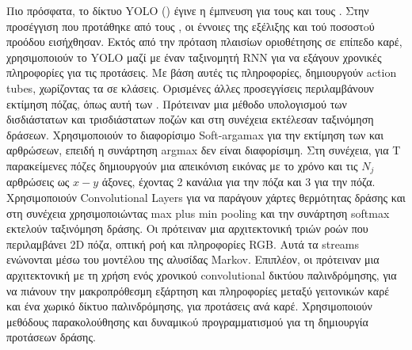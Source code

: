 Πιο πρόσφατα, το δίκτυο \en YOLO (\cite{DBLP:journals/corr/RedmonDGF15}) \gr έγινε η έμπνευση
για  τους \en \cite{DBLP:journals/corr/abs-1903-00304} \gr και τους \en \cite{DBLP:journals/corr/abs-1802-08362}\gr. Στην προσέγγιση που προτάθηκε από τους
\en  \cite{DBLP:journals/corr/abs-1903-00304}\gr, οι έννοιες της
εξέλιξης και τού ποσοστoύ προόδου εισήχθησαν. Εκτός από την πρόταση πλαισίων οριοθέτησης σε επίπεδο καρέ, χρησιμοποιούν το \en YOLO \gr μαζί με έναν ταξινομητή \en RNN \gr για
να εξάγουν χρονικές πληροφορίες για τις προτάσεις. Με βάση αυτές τις πληροφορίες, δημιουργούν \en action tubes, \gr χωρίζοντας τα  σε κλάσεις. Ορισμένες άλλες προσεγγίσεις περιλαμβάνουν
εκτίμηση πόζας, όπως αυτή των \en \cite{DBLP:journals/corr/abs-1802-09232}\gr. Πρότειναν μια μέθοδο
υπολογισμού των δισδιάστατων και τρισδιάστατων ποζών και στη συνέχεια εκτέλεσαν ταξινόμηση δράσεων.
Χρησιμοποιούν το διαφορίσιμο \en Soft-argamax \gr για   την εκτίμηση των  και 
αρθρώσεων, επειδή η συνάρτηση \en argmax \gr δεν είναι διαφορίσιμη. Στη συνέχεια, για T παρακείμενες πόζες
δημιουργούν μια απεικόνιση εικόνας με το χρόνο και τις $N_j$  αρθρώσεις  ως $x-y$ άξονες, έχοντας  2 κανάλια για την  πόζα  και 3  για την  πόζα.
Χρησιμοποιούν \en Convolutional Layers \gr για να παράγουν  χάρτες θερμότητας δράσης   και στη συνέχεια χρησιμοποιώντας \en  max plus min pooling \gr και την συνάρτηση \en softmax \gr
 εκτελούν ταξινόμηση δράσης.
 Οι \en \cite{DBLP:journals/corr/ZolfaghariOSB17} \gr πρότειναν μια αρχιτεκτονική τριών ροών που περιλαμβάνει \en 2D \gr πόζα, οπτική ροή και πληροφορίες \en  RGB\gr. Αυτά τα \en streams \gr ενώνονται
 μέσω του μοντέλου της αλυσίδας \en Markov\gr. Επιπλέον, οι \en \cite{8237881} \gr πρότειναν μια αρχιτεκτονική με τη χρήση ενός χρονικού \en convolutional \gr δικτύου παλινδρόμησης,
 για να πιάνουν την  μακροπρόθεσμη εξάρτηση και πληροφορίες  μεταξύ γειτονικών καρέ και ένα χωρικό δίκτυο παλινδρόμησης, για  προτάσεις ανά καρέ. Χρησιμοποιούν μεθόδους παρακολούθησης
και δυναμικoύ προγραμματισμού για τη δημιουργία προτάσεων δράσης. \par

